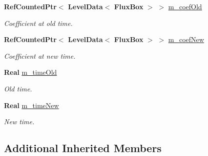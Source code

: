 \begin{DoxyCompactItemize}
\item 
\mbox{\label{class_coefficient_interpolator_linear_face_aae51740c3e19c958371b6b1136f8d9c1}} 
\textbf{ Ref\+Counted\+Ptr}$<$ \textbf{ Level\+Data}$<$ \textbf{ Flux\+Box} $>$ $>$ \hyperlink{class_coefficient_interpolator_linear_face_aae51740c3e19c958371b6b1136f8d9c1}{m\+\_\+coef\+Old}
\begin{DoxyCompactList}\small\item\em Coefficient at old time. \end{DoxyCompactList}\item 
\mbox{\label{class_coefficient_interpolator_linear_face_a8211cb341ee6772d07fc4951aab16a00}} 
\textbf{ Ref\+Counted\+Ptr}$<$ \textbf{ Level\+Data}$<$ \textbf{ Flux\+Box} $>$ $>$ \hyperlink{class_coefficient_interpolator_linear_face_a8211cb341ee6772d07fc4951aab16a00}{m\+\_\+coef\+New}
\begin{DoxyCompactList}\small\item\em Coefficient at new time. \end{DoxyCompactList}\item 
\mbox{\label{class_coefficient_interpolator_linear_face_aa4b51decdda11a34c0d910cd1be109bd}} 
\textbf{ Real} \hyperlink{class_coefficient_interpolator_linear_face_aa4b51decdda11a34c0d910cd1be109bd}{m\+\_\+time\+Old}
\begin{DoxyCompactList}\small\item\em Old time. \end{DoxyCompactList}\item 
\mbox{\label{class_coefficient_interpolator_linear_face_af4baef6ce288a442d798fe1650b9a932}} 
\textbf{ Real} \hyperlink{class_coefficient_interpolator_linear_face_af4baef6ce288a442d798fe1650b9a932}{m\+\_\+time\+New}
\begin{DoxyCompactList}\small\item\em New time. \end{DoxyCompactList}\end{DoxyCompactItemize}
\subsection*{Additional Inherited Members}


